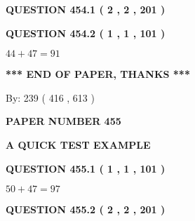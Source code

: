 \documentclass[12pt]{article}
\begin{document}
\vspace{0.2in}
  
{\textbf{\Large{QUESTION
454.1 
 ( 2 , 2 , 201 )
}}}
  
  
  
\vspace{0.2in}
  
{\textbf{\Large{QUESTION
454.2 
 ( 1 , 1 , 101 )
}}}
  
  
 
 

$ %
44 +  %
47=   %
91$
 
 
   
   
 \vspace{0.2in}
 
   
   
   
   
\vspace{1.0in} 
{\textbf{\large{ *** END OF PAPER, THANKS *** }}} 
   
   
\hspace{1.0in} By: 
 239 ( 416 ,  613 )
   
   
   
   
\newpage 
\setcounter{page}{ 
   455001 } 
   
   
   
   
 {\textbf{ \Large{ PAPER NUMBER  455  }}}
   
   
\vspace{0.2in}
   
   
   
   
   
   
 \vspace{0.2in}
{\LARGE {\textbf{ A QUICK TEST EXAMPLE}}}
   
   
  
\vspace{0.2in}
  
{\textbf{\Large{QUESTION
455.1 
 ( 1 , 1 , 101 )
}}}
  
  
 
 

$ %
50 +  %
47=   %
97$
 
 
  
\vspace{0.2in}
  
{\textbf{\Large{QUESTION
455.2 
 ( 2 , 2 , 201 )
}}}
  
  
   
   
 \vspace{0.2in}
 
\end{document}
